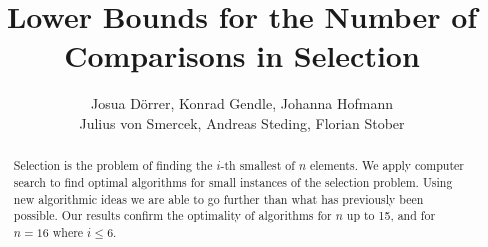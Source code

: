 \documentclass[twoside,leqno,twocolumn]{article}
\begin{document}
%
\newcommand\relatedversion{}



\title{\Large Lower Bounds for the Number of Comparisons in Selection\relatedversion}

\author{Josua Dörrer, Konrad Gendle, Johanna Hofmann \\ Julius von Smercek, Andreas Steding, Florian Stober}

\date{}

\maketitle







\begin{abstract} \small\baselineskip=9pt
  Selection is the problem of finding the $i$-th smallest of $n$ elements.
  We apply computer search to find optimal algorithms for small instances of the selection problem.
  Using new algorithmic ideas we are able to go further than what has previously been possible.
  Our results confirm the optimality of algorithms for $n$ up to 15, and for $n=16$ where $i \le 6$.

\end{abstract} %
\end{document}
